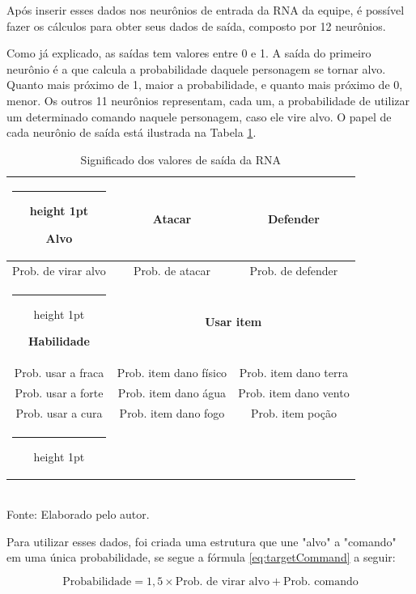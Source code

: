 \documentclass[12pt,a4paper]{article}
\makeatletter
\newcommand{\thickhline}{%
    	\noalign {\ifnum 0=`}\fi \hrule height 1pt
    	\futurelet \reserved@a \@xhline
	}
\newcommand{\source}[1]{\small Fonte: {#1}}
\makeatother
\begin{document}
	Após inserir esses dados nos neurônios de entrada da RNA da equipe,
	é possível fazer os cálculos para obter seus dados de saída,
	composto por 12 neurônios.
	
	Como já explicado, as saídas tem valores entre 0 e 1.
	A saída do primeiro neurônio é a que calcula a probabilidade daquele personagem se tornar alvo.
	Quanto mais próximo de 1, maior a probabilidade,
	e quanto mais próximo de 0, menor.
	Os outros 11 neurônios representam, cada um, a probabilidade de utilizar um determinado comando naquele personagem, caso ele vire alvo.
	O papel de cada neurônio de saída está ilustrada na Tabela \ref{tab:nnOutput}.
	
	\begin{table}[h]
		\caption{Significado dos valores de saída da RNA}
		\centering
		\small
		\renewcommand{\arraystretch}{1.2} %
		\begin{tabular}{c|c|c}
			\thickhline 
			\textbf{Alvo}				& \textbf{Atacar}						& \textbf{Defender}				\\\hline
			Prob. de virar alvo			& Prob. de atacar						& Prob. de defender				\\\thickhline
			\textbf{Habilidade}			& 					\multicolumn{2}{c}{\textbf{Usar item}}				\\\hline
			Prob. usar a fraca			& Prob. item dano físico				& Prob. item dano terra			\\ 
			Prob. usar a forte			& Prob. item dano água					& Prob. item dano vento			\\ 
			Prob. usar a cura			& Prob. item dano fogo					& Prob. item poção				\\\thickhline
		\end{tabular}\\
		\vspace{3mm}
		\source{Elaborado pelo autor.}
		\label{tab:nnOutput}
	\end{table}
	
	Para utilizar esses dados,
	foi criada uma estrutura que une "alvo"{} a "comando"{} em uma única probabilidade,
	se segue a fórmula \eqref{eq:targetCommand} a seguir:
	
	\begin{equation}
		\textrm{Probabilidade} = 1,5 \times \textrm{Prob. de virar alvo} + \textrm{Prob. comando}
		\label{eq:targetCommand}
	\end{equation}
	
\end{document}
